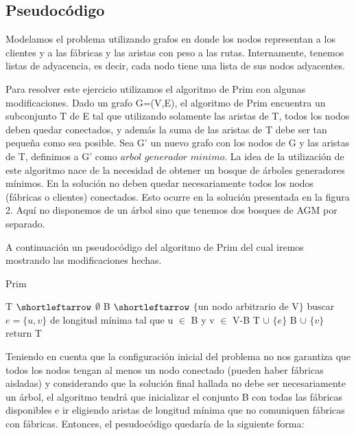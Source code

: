 \subsection{Pseudocódigo}

Modelamos el problema utilizando grafos en donde los nodos representan a los clientes y a las fábricas y las aristas con peso a las rutas. Internamente, tenemos listas de adyacencia, es decir, cada nodo tiene una lista de sus nodos adyacentes.

Para resolver este ejercicio utilizamos el algoritmo de Prim con algunas modificaciones. Dado un grafo G=(V,E), el algoritmo de Prim encuentra un subconjunto T de E tal que utilizando solamente las aristas de T, todos los nodos deben quedar conectados, y además la suma de las aristas de T debe ser tan pequeña como sea posible. Sea G' un nuevo grafo con los nodos de G y las aristas de T, definimos a G' como $arbol$ $generador$ $minimo$. La idea de la utilización de este algoritmo nace de la necesidad de obtener un bosque de árboles generadores mínimos. En la solución no deben quedar necesariamente todos los nodos (fábricas o clientes) conectados. Esto ocurre en la solución presentada en la figura 2. Aquí no disponemos de un árbol sino que tenemos dos bosques de AGM por separado.

A continuación un pseudocódigo del algoritmo de Prim del cual iremos mostrando las modificaciones hechas.

\begin{algorithm}
\caption{Prim}\label{ej1}
\begin{algorithmic}[1]
	\State T  $\shortleftarrow$ $\emptyset$
	\State B $\shortleftarrow$ $\{$un nodo arbitrario de V$\}$
		\State buscar $e=\{u,v\}$ de longitud mínima tal que u $\in$ B y v $\in$ V-B
		\State T $\cup$ $\{e\}$
		\State B $\cup$ $\{v\}$
	\EndWhile
	\State return T
\EndProcedure
\end{algorithmic}
\end{algorithm}


Teniendo en cuenta que la configuración inicial del problema no nos garantiza que todos los nodos tengan al menos un nodo conectado (pueden haber fábricas aisladas) y considerando que la solución final hallada no debe ser necesariamente un árbol, el algoritmo tendrá que  inicializar el conjunto B con todas las fábricas disponibles e ir eligiendo aristas de longitud mínima que no comuniquen fábricas con fábricas. Entonces, el pesudocódigo quedaría de la siguiente forma:

